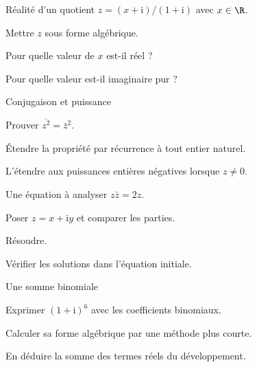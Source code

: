 \begingroup\renewcommand{\otBesoinPlace}[1]{}\begin{minipage}{\linewidth}
\begin{exercice}[3]{Réalité d’un quotient}
$z=(x+\mathrm i)/(1+\mathrm i)$ avec $x\in\R$.
\begin{questions}
\item Mettre $z$ sous forme algébrique.
\item Pour quelle valeur de $x$ est-il réel ?
\item Pour quelle valeur est-il imaginaire pur ?
\end{questions}
\end{exercice}
\begin{exercice}[3]{Conjugaison et puissance}

\begin{questions}
\item Prouver $\overline{z^2}=\bar z^2$.
\item Étendre la propriété par récurrence à tout entier naturel.
\item L’étendre aux puissances entières négatives lorsque $z\ne0$.
\end{questions}
\end{exercice}
\begin{exercice}[3]{Une équation à analyser}
$z\bar z=2z$.
\begin{questions}
\item Poser $z=x+\mathrm iy$ et comparer les parties.
\item Résoudre.
\item Vérifier les solutions dans l’équation initiale.
\end{questions}
\end{exercice}
\begin{exercice}[3]{Une somme binomiale}

\begin{questions}
\item Exprimer $(1+\mathrm i)^6$ avec les coefficients binomiaux.
\item Calculer sa forme algébrique par une méthode plus courte.
\item En déduire la somme des termes réels du développement.
\end{questions}
\end{exercice}
\end{minipage}\endgroup
